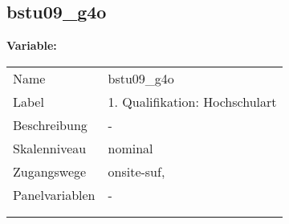 	
	
	\subsection{bstu09\_g4o}
	\label{subSection:bstu09_g4o}

	\noindent\textbf{Variable:}\\
		\begin{tabular}{lL{11.3cm}}
			\label{tableVariable:bstu09_g4o}
			Name & bstu09\_g4o \\
			Label & 1. Qualifikation: Hochschulart \\
			Beschreibung & - \\
			Skalenniveau & nominal \\
			Zugangswege &
				onsite-suf,
 \\
			Panelvariablen & -
			 \\
			 \\
 \\
		\end{tabular}






